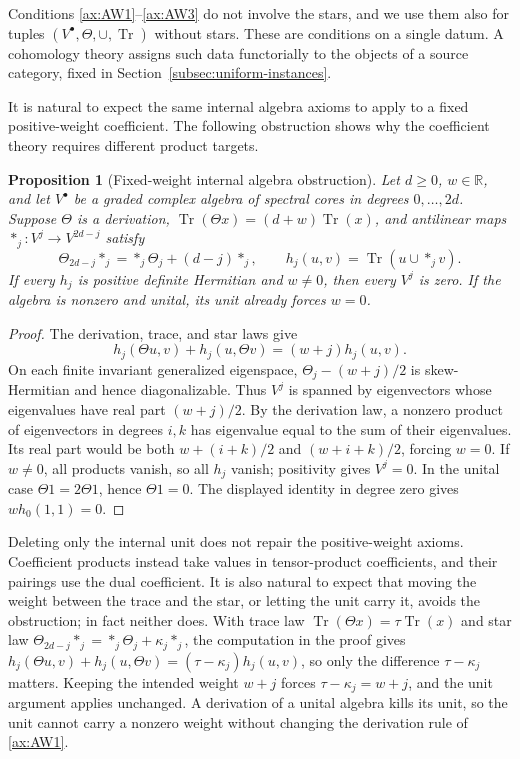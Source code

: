 \documentclass[11pt]{amsart}
\theoremstyle{plain}
\newtheorem{proposition}[theorem]{Proposition}
\theoremstyle{definition}
\theoremstyle{remark}
\numberwithin{equation}{section}
\newcommand{\R}{\mathbb{R}}
\DeclareMathOperator{\Tr}{Tr}
\begin{document}
Conditions \ref{ax:AW1}--\ref{ax:AW3} do not involve the stars, and we
use them also for tuples $(V^\bullet,\Theta,\cup,\Tr)$ without stars.
These are conditions on a single datum. A cohomology theory assigns
such data functorially to the objects of a source category, fixed in
Section~\ref{subsec:uniform-instances}.

It is natural to expect the same internal algebra axioms to apply to a
fixed positive-weight coefficient. The following obstruction shows why
the coefficient theory requires different product targets.

\begin{proposition}[Fixed-weight internal algebra obstruction]
\label{prop:weighted-algebra-obstruction}
Let $d\ge0$, $w\in\R$, and let $V^\bullet$ be a graded complex
algebra of spectral cores in degrees $0,\ldots,2d$. Suppose $\Theta$
is a derivation, $\Tr(\Theta x)=(d+w)\Tr(x)$, and antilinear maps
$*_j:V^j\to V^{2d-j}$ satisfy
\[
\Theta_{2d-j}*_j=*_j\Theta_j+(d-j)*_j,
\qquad h_j(u,v)=\Tr(u\cup *_jv).
\]
If every $h_j$ is positive definite Hermitian and $w\ne0$, then
every $V^j$ is zero. If the algebra is nonzero and unital, its unit
already forces $w=0$.
\end{proposition}

\begin{proof}
The derivation, trace, and star laws give
\[
h_j(\Theta u,v)+h_j(u,\Theta v)=(w+j)h_j(u,v).
\]
On each finite invariant generalized eigenspace,
$\Theta_j-(w+j)/2$ is skew-Hermitian and hence diagonalizable.
Thus $V^j$ is spanned by eigenvectors whose eigenvalues have real
part $(w+j)/2$. By the derivation law, a nonzero product of
eigenvectors in degrees $i,k$ has eigenvalue equal to the sum of
their eigenvalues. Its real part would be both
$w+(i+k)/2$ and $(w+i+k)/2$, forcing $w=0$. If $w\ne0$, all
products vanish, so all $h_j$ vanish; positivity gives $V^j=0$.
In the unital case $\Theta1=2\Theta1$, hence $\Theta1=0$.
The displayed identity in degree zero gives $w h_0(1,1)=0$.
\end{proof}

Deleting only the internal unit does not repair the positive-weight
axioms. Coefficient products instead take values in tensor-product
coefficients, and their pairings use the dual coefficient.
It is also natural to expect that moving the weight between the trace
and the star, or letting the unit carry it, avoids the obstruction; in
fact neither does. With trace law $\Tr(\Theta x)=\tau\Tr(x)$ and star
law $\Theta_{2d-j}*_j=*_j\Theta_j+\kappa_j*_j$, the computation in the
proof gives
$h_j(\Theta u,v)+h_j(u,\Theta v)=(\tau-\kappa_j)h_j(u,v)$, so only
the difference $\tau-\kappa_j$ matters. Keeping the intended weight
$w+j$ forces $\tau-\kappa_j=w+j$, and the unit argument applies
unchanged. A derivation of a unital algebra kills its unit, so the
unit cannot carry a nonzero weight without changing the derivation
rule of \ref{ax:AW1}.
\end{document}
